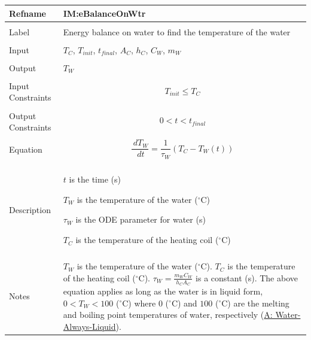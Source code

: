 \documentclass[12pt]{article}
\begin{document}
\vspace{\baselineskip}
\noindent
\begin{minipage}{\textwidth}
\begin{tabular}{>{\raggedright}p{}>{\raggedright\arraybackslash}p{}}
\toprule \textbf{Refname} & \textbf{IM:eBalanceOnWtr}
\label{IM:eBalanceOnWtr}
\\ \midrule \\
Label & Energy balance on water to find the temperature of the water
        
\\ \midrule \\
Input & ${T_{C}}$, ${T_{init}}$, ${t_{final}}$, ${A_{C}}$, ${h_{C}}$, ${C_{W}}$, ${m_{W}}$
        
\\ \midrule \\
Output & ${T_{W}}$
         
\\ \midrule \\
Input Constraints & \begin{displaymath}
                    {T_{init}}\leq{}{T_{C}}
                    \end{displaymath}
\\ \midrule \\
Output Constraints & \begin{displaymath}
                     0<t<{t_{final}}
                     \end{displaymath}
\\ \midrule \\
Equation & \begin{displaymath}
           \frac{\,d{T_{W}}}{\,dt}=\frac{1}{{τ_{W}}} \left({T_{C}}-{T_{W}}\left(t\right)\right)
           \end{displaymath}
\\ \midrule \\
Description & \begin{symbDescription}
              \item{$t$ is the time (s)}
              \item{${T_{W}}$ is the temperature of the water (${}^{\circ}$C)}
              \item{${τ_{W}}$ is the ODE parameter for water (s)}
              \item{${T_{C}}$ is the temperature of the heating coil (${}^{\circ}$C)}
              \end{symbDescription}
\\ \midrule \\
Notes & ${T_{W}}$ is the temperature of the water (${}^{\circ}$C). ${T_{C}}$ is the temperature of the heating coil (${}^{\circ}$C). ${τ_{W}}=\frac{{m_{W}} {C_{W}}}{{h_{C}} {A_{C}}}$ is a constant (s). The above equation applies as long as the water is in liquid form, $0<{T_{W}}<100$ (${}^{\circ}$C) where $0$ (${}^{\circ}$C) and $100$ (${}^{\circ}$C) are the melting and boiling point temperatures of water, respectively (\hyperref[assumpWAL]{A: Water-Always-Liquid}).
        

\end{tabular}
\end{minipage}
\end{document}
